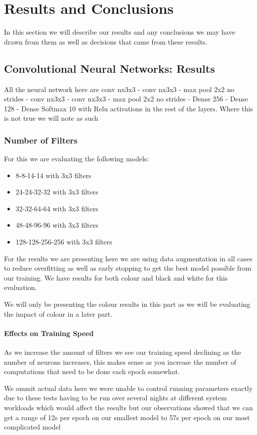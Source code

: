 \chapter{Results and Conclusions}
In this section we will describe our results and any conclusions we may have drawn from them as well as decisions that came from these results.
\section{Convolutional Neural Networks: Results}
All the neural network here are conv nx3x3 - conv nx3x3 - max pool 2x2 no strides - conv nx3x3 - conv nx3x3 - max pool 2x2 no strides - Dense 256 - Dense 128 - Dense Softmax 10 with Relu activations in the rest of the layers. Where this is not true we will note as such
\subsection{Number of Filters}
For this we are evaluating the following models:
\begin{itemize}
	\item 8-8-14-14 with 3x3 filters
	\item 24-24-32-32 with 3x3 filters
	\item 32-32-64-64 with 3x3 filters
	\item 48-48-96-96 with 3x3 filters
	\item 128-128-256-256 with 3x3 filters
\end{itemize}
For the results we are presenting here we are using data augmentation in all cases to reduce overfitting as well as early stopping to get the best model possible from our training. We have results for both colour and black and white for this evaluation.

We will only be presenting the colour results in this part as we will be evaluating the impact of colour in a later part.

\subsubsection{Effects on Training Speed}
As we increase the amount of filters we see our training speed declining as the number of neurons increases, this makes sense as you increase the number of computations that need to be done each epoch somewhat.

We ommit actual data here we were unable to control running parameters exactly due to these tests having to be run over several nights at different system workloads which would affect the results but our observations showed that we can get a range of 12s per epoch on our smallest model to 57s per epoch on our most complicated model
